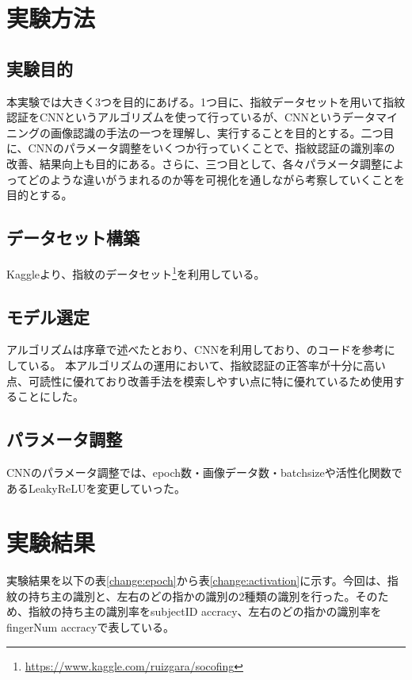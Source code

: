 \documentclass[a4paper, 11pt, titlepage]{jsarticle}
\begin{document}
\section{実験方法}


\subsection{実験目的}
本実験では大きく3つを目的にあげる。1つ目に、指紋データセットを用いて指紋認証をCNNというアルゴリズムを使って行っているが、CNNというデータマイニングの画像認識の手法の一つを理解し、実行することを目的とする。二つ目に、CNNのパラメータ調整をいくつか行っていくことで、指紋認証の識別率の改善、結果向上も目的にある。さらに、三つ目として、各々パラメータ調整によってどのような違いがうまれるのか等を可視化を通しながら考察していくことを目的とする。


\subsection{データセット構築}
Kaggleより、指紋のデータセット\footnote{\url{https://www.kaggle.com/ruizgara/socofing}}を利用している。

\subsection{モデル選定}
アルゴリズムは序章で述べたとおり、CNNを利用しており、\cite{algorithm}のコードを参考にしている。
本アルゴリズムの運用において、指紋認証の正答率が十分に高い点、可読性に優れており改善手法を模索しやすい点に特に優れているため使用することにした。

\subsection{パラメータ調整}
CNNのパラメータ調整では、epoch数・画像データ数・batchsizeや活性化関数であるLeakyReLUを変更していった。


\section{実験結果}

実験結果を以下の表\ref{change:epoch}から表\ref{change:activation}に示す。今回は、指紋の持ち主の識別と、左右のどの指かの識別の2種類の識別を行った。そのため、指紋の持ち主の識別率をsubjectID accracy、左右のどの指かの識別率をfingerNum accracyで表している。
\end{document}
